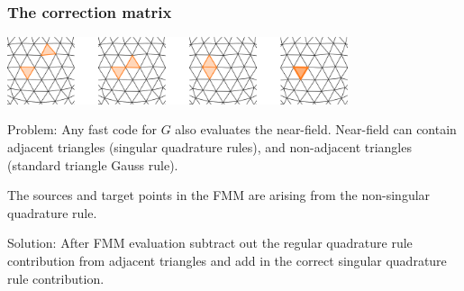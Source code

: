 \documentclass[dvipsnames,10pt]{beamer}
\begin{document}
\begin{frame}
    \frametitle{The correction matrix}

    \begin{center}
        \includegraphics[width=10cm]{../figs/triangles.png}
    \end{center}

    Problem: Any fast code for $G$ also evaluates the near-field.
    Near-field can contain adjacent triangles (singular quadrature rules), and
    non-adjacent triangles (standard triangle Gauss rule).

    \vspace{.5cm}

    The sources and target points in the FMM are arising from the
    non-singular quadrature rule.

    \vspace{.5cm}

    Solution: After FMM evaluation subtract out the regular quadrature rule
    contribution from adjacent triangles and add in the correct singular quadrature
    rule contribution.

\end{frame}
\end{document}
